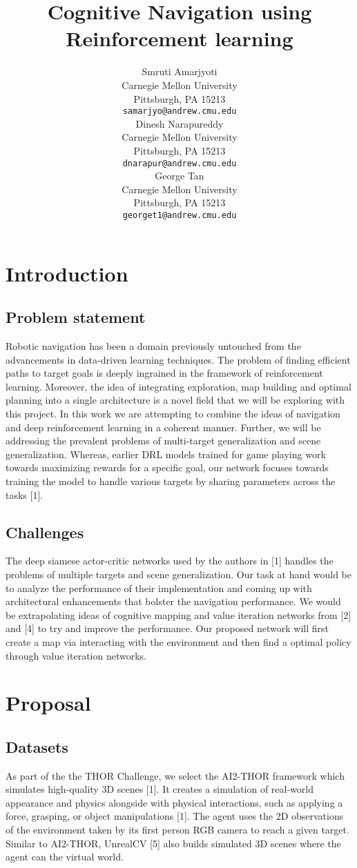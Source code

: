 \documentclass{article}
\title{Cognitive Navigation using Reinforcement learning}
\author{
  Smruti Amarjyoti \\
  Carnegie Mellon University\\
  Pittsburgh, PA 15213 \\
  \texttt{samarjyo@andrew.cmu.edu} \\
  \And
  Dinesh Narapureddy \\
  Carnegie Mellon University\\
  Pittsburgh, PA 15213 \\
  \texttt{dnarapur@andrew.cmu.edu} \\
  \And
  George Tan \\
  Carnegie Mellon University\\
  Pittsburgh, PA 15213 \\
  \texttt{georget1@andrew.cmu.edu} \\
}
\begin{document}
\maketitle

\section{Introduction}
\subsection{Problem statement}
Robotic navigation has been a domain previously untouched from the advancements in data-driven learning techniques. The problem of finding efficient paths to target goals is deeply ingrained in the framework of reinforcement learning. Moreover, the idea of integrating exploration, map building and optimal planning into a single architecture is a novel field that we will be exploring with this project. In this work we are attempting to combine the ideas of navigation and deep reinforcement learning in a coherent manner. Further, we will be addressing the prevalent problems of multi-target generalization and scene generalization. Whereas, earlier DRL models trained for game playing work towards maximizing rewards for a specific goal, our network focuses towards training the model to handle various targets by sharing parameters across the tasks [1].

\subsection{Challenges}
The deep siamese actor-critic networks used by the authors in [1] handles the problems of multiple targets and scene generalization. Our task at hand would be to analyze the performance of their implementation and coming up with architectural enhancements that bolster the navigation performance. We would be extrapolating ideas of cognitive mapping and value iteration networks from [2] and [4] to try and improve the performance. Our proposed network will first create a map via interacting with the environment and then find a optimal policy through value iteration networks.

\section{Proposal}
\subsection{Datasets}
As part of the the THOR Challenge, we select the AI2-THOR framework which simulates high-quality 3D scenes [1]. It creates a simulation of real-world appearance and physics alongside with physical interactions, such as applying a force, grasping, or object manipulations [1]. The agent uses the 2D observations of the environment taken by its first person RGB camera to reach a given target. Similar to AI2-THOR, UnrealCV [5] also builds simulated 3D scenes where the agent can the virtual world.
\end{document}
